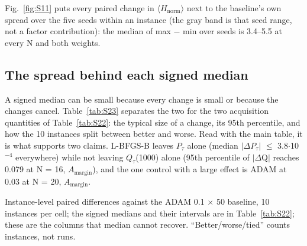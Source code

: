 \documentclass[journal]{IEEEtran}
\begin{document}
Fig.~\ref{fig:S11} puts every paired change in $\langle$$H_{\mathrm{norm}}$$\rangle$ next to the baseline's own spread over the five seeds within an instance (the gray band is that seed range, not a factor contribution): the median of max $-$ min over seeds is 3.4--5.5 at every N and both weights.


\subsection{The spread behind each signed median}


A signed median can be small because every change is small or because the changes cancel. Table~\ref{tab:S23} separates the two for the two acquisition quantities of Table~\ref{tab:S22}: the typical size of a change, its 95th percentile, and how the 10 instances split between better and worse. Read with the main table, it is what supports two claims. L-BFGS-B leaves $P_{\tau}$ alone (median $|$$\Delta$$P_{\tau}$$|$ $\leq$ 3.8$\cdot$10$^{-4}$ everywhere) while not leaving $Q_{\tau}$(1000) alone (95th percentile of $|$$\Delta$Q$|$ reaches 0.079 at N = 16, $A_{\mathrm{margin}}$), and the one control with a large effect is ADAM at 0.03 at N = 20, $A_{\mathrm{margin}}$.


Instance-level paired differences against the ADAM 0.1 $\times$ 50 baseline, 10 instances per cell; the signed medians and their intervals are in Table~\ref{tab:S22}; these are the columns that median cannot recover. ``Better/worse/tied'' counts instances, not runs.
\end{document}
